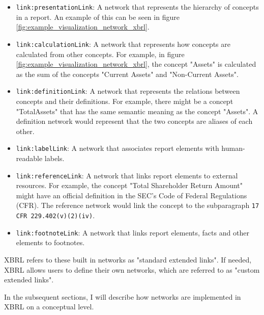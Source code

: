 \begin{itemize}
    \item \texttt{link:presentationLink}: A network that represents the hierarchy of concepts in a report. An example of this can be seen in figure \ref{fig:example_visualization_network_xbrl}.
    \item \texttt{link:calculationLink}: A network that represents how concepts are calculated from other concepts. 
    For example, in figure \ref{fig:example_visualization_network_xbrl}, the concept "Assets" is calculated as the sum of the concepts "Current Assets" and "Non-Current Assets".
    \item \texttt{link:definitionLink}: A network that represents the relations between concepts and their definitions. 
    For example, there might be a concept "TotalAssets" that has the same semantic meaning as the concept "Assets". 
    A definition network would represent that the two concepts are aliases of each other.
    \item \texttt{link:labelLink}: A network that associates report elements with human-readable labels.
    \item \texttt{link:referenceLink}: A network that links report elements to external resources. 
    For example, the concept "Total Shareholder Return Amount" might have an official definition in the SEC's Code of Federal Regulations (CFR).
    The reference network would link the concept to the subparagraph \texttt{17 CFR 229.402(v)(2)(iv)}\cite{cfr_total_shareholder_return_amount}.
    \item \texttt{link:footnoteLink}: A network that links report elements, facts and other elements to footnotes.
\end{itemize}

XBRL refers to these built in networks as "standard extended links". 
If needed, XBRL allows users to define their own networks, which are referred to as "custom extended links"\cite{xbrl21_terminology}.

In the subsequent sections, I will describe how networks are implemented in XBRL on a conceptual level. 
